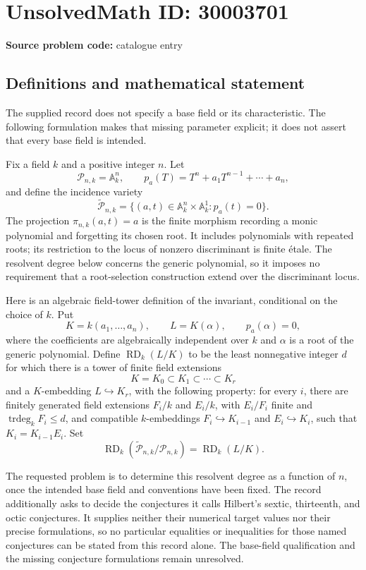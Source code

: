 \documentclass[11pt]{article}
\begin{document}
\section*{UnsolvedMath ID: 30003701}
\textbf{Source problem code:} catalogue entry
\subsection{Definitions and mathematical statement}
The supplied record does not specify a base field or its characteristic. The following formulation makes that missing parameter explicit; it does not assert that every base field is intended.

Fix a field \(k\) and a positive integer \(n\). Let
\[
\mathcal P_{n,k}=\mathbb A_k^n,
\qquad
p_a(T)=T^n+a_1T^{n-1}+\cdots+a_n,
\]
and define the incidence variety
\[
\widetilde{\mathcal P}_{n,k}
=\{(a,t)\in\mathbb A_k^n\times\mathbb A_k^1:p_a(t)=0\}.
\]
The projection \(\pi_{n,k}(a,t)=a\) is the finite morphism recording a monic polynomial and forgetting its chosen root. It includes polynomials with repeated roots; its restriction to the locus of nonzero discriminant is finite étale. The resolvent degree below concerns the generic polynomial, so it imposes no requirement that a root-selection construction extend over the discriminant locus.

Here is an algebraic field-tower definition of the invariant, conditional on the choice of \(k\). Put
\[
K=k(a_1,\ldots,a_n),\qquad L=K(\alpha),\qquad p_a(\alpha)=0,
\]
where the coefficients are algebraically independent over \(k\) and \(\alpha\) is a root of the generic polynomial. Define \(\operatorname{RD}_k(L/K)\) to be the least nonnegative integer \(d\) for which there is a tower of finite field extensions
\[
K=K_0\subset K_1\subset\cdots\subset K_r
\]
and a \(K\)-embedding \(L\hookrightarrow K_r\), with the following property: for every \(i\), there are finitely generated field extensions \(F_i/k\) and \(E_i/k\), with \(E_i/F_i\) finite and \(\operatorname{trdeg}_k F_i\le d\), and compatible \(k\)-embeddings \(F_i\hookrightarrow K_{i-1}\) and \(E_i\hookrightarrow K_i\), such that \(K_i=K_{i-1}E_i\). Set
\[
\operatorname{RD}_k(\widetilde{\mathcal P}_{n,k}/\mathcal P_{n,k})
=\operatorname{RD}_k(L/K).
\]

The requested problem is to determine this resolvent degree as a function of \(n\), once the intended base field and conventions have been fixed. The record additionally asks to decide the conjectures it calls Hilbert's sextic, thirteenth, and octic conjectures. It supplies neither their numerical target values nor their precise formulations, so no particular equalities or inequalities for those named conjectures can be stated from this record alone. The base-field qualification and the missing conjecture formulations remain unresolved.
\end{document}

